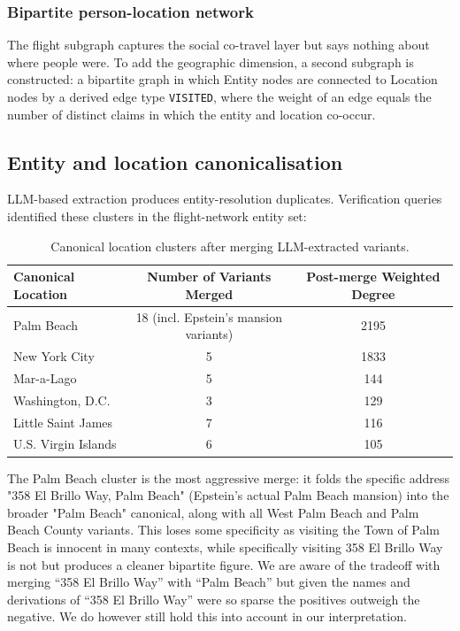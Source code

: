 \subsubsection{Bipartite person-location network}
The flight subgraph captures the social co-travel layer but says nothing about where people were. To add the geographic dimension, a second subgraph is constructed: a bipartite graph in which Entity nodes are connected to Location nodes by a derived edge type \texttt{VISITED}, where the weight of an edge equals the number of distinct claims in which the entity and location co-occur.
\subsection{Entity and location canonicalisation}
LLM-based extraction produces entity-resolution duplicates. Verification queries identified these clusters in the flight-network entity set:
\begin{table}[H]
    \centering
    \begin{tabular}{l c c}
        \toprule
        Canonical Location & Number of Variants Merged & Post-merge Weighted Degree \\
        \midrule
            Palm Beach & 18 (incl. Epstein's mansion variants) & 2195 \\
            New York City & 5 & 1833 \\
            Mar-a-Lago & 5 & 144 \\
            Washington, D.C. & 3 & 129 \\
            Little Saint James & 7 & 116 \\
            U.S. Virgin Islands & 6 & 105 \\
        \bottomrule
    \end{tabular}
    \caption{Canonical location clusters after merging LLM-extracted variants.}
    \label{tab:canonical_locations}
\end{table}
The Palm Beach cluster is the most aggressive merge: it folds the specific address "358 El Brillo Way, Palm Beach" (Epstein's actual Palm Beach mansion) into the broader "Palm Beach" canonical, along with all West Palm Beach and Palm Beach County variants. This loses some specificity as visiting the Town of Palm Beach is innocent in many contexts, while specifically visiting 358 El Brillo Way is not but produces a cleaner bipartite figure. We are aware of the tradeoff with merging  ``358 El Brillo Way'' with ``Palm Beach'' but given the names and derivations of ``358 El Brillo Way'' were so sparse the positives outweigh the negative. We do however still hold this into account in our interpretation.
